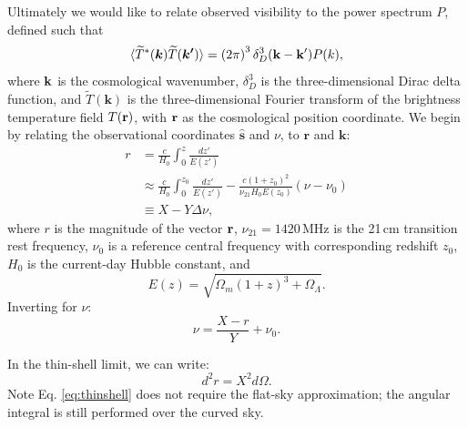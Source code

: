 \documentclass[twocolumn,apj,numberedappendix]{emulateapj}
\renewcommand\[{\begin{equation}}
\renewcommand\]{\end{equation}}
\begin{document}



Ultimately we would like to relate observed visibility to the power spectrum $P$, defined such that
\[
\langle \widetilde{T}^{*}(\boldsymbol{k})\widetilde{T}(\boldsymbol{k'})\rangle = \left(2\pi\right)^3\delta_D^3(\bold{k}-\bold{k'})P(k),
\label{eq:Pofk}
\]
where $\bold{k}$ is the cosmological wavenumber, $\delta_D^3$ is the three-dimensional Dirac delta function, and $\widetilde{T}(\boldsymbol{k})$ is the three-dimensional Fourier transform of the brightness temperature field $T(\bold{r})$, with $\bold r$ as the cosmological position coordinate. 
We begin by relating the observational coordinates $\hat{\boldsymbol{s}}$
and $\nu$, to
$\boldsymbol{r}$ and $\boldsymbol{k}$: 
\[
\begin{aligned}r & =\frac{c}{H_{0}}\int_{0}^{z}\frac{dz'}{E(z')}\\
 & \approx\frac{c}{H_{0}}\int_{0}^{z_{0}}\frac{dz'}{E(z')}-\frac{c(1+z_0)^{2}}{\nu_{21}H_{0}E(z_0)}\left(\nu-\nu_{0}\right)\\
 & \equiv X-Y\Delta\nu,
\end{aligned} \label{eq:r}
\]
where $r$ is the magnitude of the vector $\bold{r}$, $\nu_{21}=1420$\,MHz is the 21\,cm transition rest frequency, $\nu_{0}$ is
a reference central frequency with corresponding redshift $z_{0}$, $H_0$ is the current-day Hubble constant,  
and 
\[
E(z)=\sqrt{\Omega_{m}(1+z)^{3}+\Omega_{\Lambda}}.
\]
Inverting for $\nu$:
\begin{equation}
\nu=\frac{X-r}{Y}+\nu_{0}.\label{eq:nur}
\end{equation}

In the thin-shell limit, we can write:
\begin{equation}
d^2r=X^2d\Omega. 
\label{eq:thinshell}
\end{equation}
Note Eq. \eqref{eq:thinshell} does not require the flat-sky approximation; the angular integral is still performed over the curved sky. 
\end{document}
